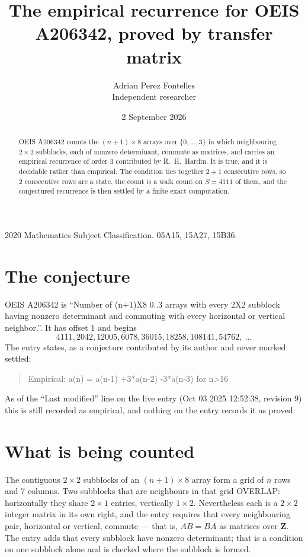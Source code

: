 \documentclass[11pt,a4paper]{article}
\title{The empirical recurrence for OEIS A206342, proved by transfer matrix}
\author{Adrian Perez Fontelles\\ \small Independent researcher}
\date{2 September 2026}
\theoremstyle{plain}
\theoremstyle{definition}
\begin{document}
\maketitle

\begin{abstract}
OEIS A206342 counts the $(n+1)\times8$ arrays over $\{0,\dots,3\}$ in which
neighbouring $2\times2$ subblocks, each of nonzero determinant, commute as matrices, and carries an empirical
recurrence
of order $3$ contributed by R.~H.~Hardin. It is true, and it is decidable rather than
empirical. The condition ties together $2+1$ consecutive rows, so $2$ consecutive rows are
a state, the count is a walk count on $S=4111$ of them, and the conjectured recurrence is then
settled by a finite exact computation.
\end{abstract}

\noindent\small 2020 Mathematics Subject Classification. 05A15, 15A27, 15B36.\normalsize

\section{The conjecture}

OEIS A206342 is ``Number of (n+1)X8 0..3 arrays with every 2X2 subblock having nonzero determinant and commuting with every horizontal or vertical neighbor.''. It has offset $1$ and begins
\[
4111, 2042, 12005, 6078, 36015, 18258, 108141, 54762,\ \dots
\]
The entry states, as a conjecture contributed by its author and never marked settled:
\begin{quote}
Empirical: a(n) = a(n-1) +3*a(n-2) -3*a(n-3) for n>16
\end{quote}
As of the ``Last modified'' line on the live entry (Oct 03 2025 12:52:38, revision 9) this is still
recorded as empirical, and nothing on the entry records it as proved.

\section{What is being counted}

The contiguous $2\times2$ subblocks of an $(n+1)\times8$ array form a grid of $n$
rows and $7$ columns. Two subblocks that are neighbours in that
grid OVERLAP: horizontally they share $2\times1$ entries, vertically
$1\times2$. Nevertheless each is a $2\times2$ integer matrix in its own right, and
the entry requires that every neighbouring pair, horizontal or vertical, commute --- that is,
$AB=BA$ as matrices over $\mathbf{Z}$. The entry adds that every subblock have nonzero determinant; that is a condition on one subblock alone and is checked where the subblock is formed.
\end{document}
